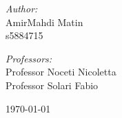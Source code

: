 \begin{titlepage}
\begin{center}
    \large \emph{Author:}\\[0.2cm]
    \Large AmirMahdi Matin\\
    s5884715

    \vspace{0.5cm}

    \large \emph{Professors:} \\[0.2cm]
    \Large Professor Noceti Nicoletta\\
    \Large Professor Solari Fabio  \\[1.2em] %

    \makeatother



    \vfill %
    {\large \today} %

\end{center}

\end{titlepage}